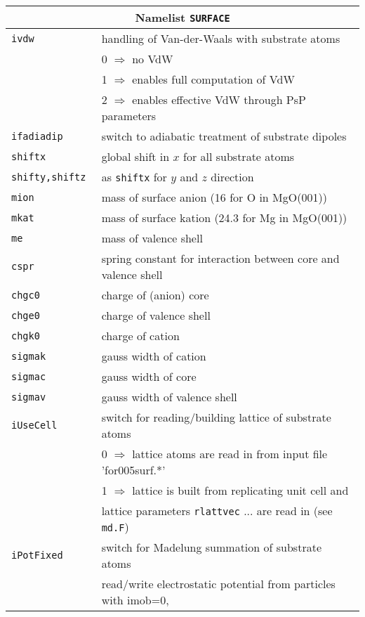 \documentclass[12pt]{article}
\begin{document}
\begin{tabular}{ll}
\hline
\multicolumn{2}{c}{Namelist {\tt SURFACE}} in {\tt for005.<name>} \\
\hline
{\tt ivdw} & handling of Van-der-Waals with substrate atoms\\
    & 0 $\Longrightarrow$ no VdW\\
    & 1 $\Longrightarrow$ enables full computation of VdW\\
    & 2 $\Longrightarrow$ enables effective VdW through PsP parameters\\
{\tt ifadiadip        }& switch to adiabatic treatment of substrate dipoles\\
{\tt shiftx           }& global shift in $x$ for all substrate atoms\\
{\tt shifty,shiftz    }& as {\tt shiftx} for $y$ and $z$ direction\\
{\tt mion             }& mass of surface anion (16 for O in MgO(001))\\
{\tt mkat             }& mass of surface kation (24.3 for Mg in MgO(001))\\
{\tt me               }& mass of valence shell\\
{\tt cspr             }& spring constant for interaction between core and valence shell\\
{\tt chgc0            }& charge of (anion) core\\
{\tt chge0            }& charge of valence shell\\
{\tt chgk0            }& charge of cation\\
{\tt sigmak           }& gauss width of cation\\
{\tt sigmac           }& gauss width of core\\
{\tt sigmav           }& gauss width of valence shell\\
{\tt iUseCell         }& switch for reading/building lattice of
                          substrate atoms\\
   & 0 $\Longrightarrow$ lattice atoms are read in from input file 'for005surf.*'\\
   & 1 $\Longrightarrow$ lattice is built from replicating unit cell and\\
   &\qquad lattice parameters {\tt rlattvec} ... are
                          read in (see {\tt md.F})\\
{\tt iPotFixed        }& switch for Madelung summation of substrate atoms\\
   & read/write electrostatic potential from particles with imob=0,\\

\end{tabular}
\end{document}

